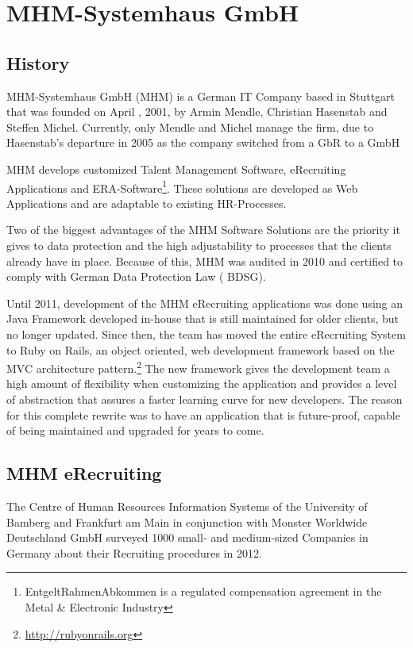\chapter{MHM-Systemhaus GmbH}\label{ch:mhm}

\section{History}
MHM-Systemhaus GmbH (MHM) is a German IT Company based in Stuttgart that was founded on April , 2001, by Armin Mendle, Christian Hasenstab and Steffen Michel. Currently, only Mendle and Michel manage the firm, due to Hasenstab's departure in 2005 as the company switched from a GbR to a GmbH

MHM develops customized Talent Management Software, eRecruiting Applications and ERA-Software\footnote{EntgeltRahmenAbkommen is a regulated compensation agreement in the Metal \& Electronic Industry}. These solutions are developed as Web Applications and are adaptable to existing HR-Processes.

Two of the biggest advantages of the MHM Software Solutions are the priority it gives to data protection and the high adjustability to processes that the clients already have in place. Because of this, MHM was audited in 2010 and certified to comply with German Data Protection Law ( BDSG).\cite{michel:2012}

Until 2011, development of the MHM eRecruiting applications was done using an  Java Framework developed in-house that is still maintained for older clients, but no longer updated. Since then, the team has moved the entire eRecruiting System to Ruby on Rails, an object oriented, web development framework based on the \ac{MVC} architecture pattern.\footnote{\url{http://rubyonrails.org}} The new framework gives the development team a high amount of flexibility when customizing the application and provides a level of abstraction that assures a faster learning curve for new developers. The reason for this complete rewrite was to have an application that is future-proof, capable of being maintained and upgraded for years to come.

\section{MHM eRecruiting}
The Centre of Human Resources Information Systems of the University of Bamberg and Frankfurt am Main in conjunction with Monster Worldwide Deutschland GmbH surveyed 1000 small- and medium-sized Companies in Germany about their Recruiting procedures in 2012.\cite[p. 6]{weitzel:2012}

